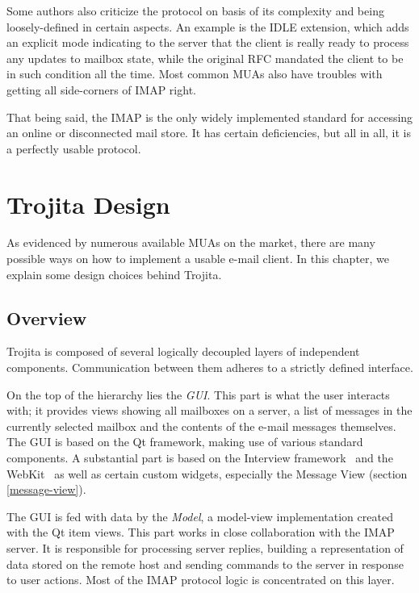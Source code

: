 \documentclass[12pt,notitlepage]{report}
\newcommand{\trojita}{Trojita\xspace}
\begin{document}
Some authors also criticize the protocol on basis of its complexity and being
loosely-defined in certain aspects.  An example is the IDLE \cite{rfc-idle}
extension, which adds an explicit mode indicating to the server that the client
is really ready to process any updates to mailbox state, while the original RFC
mandated the client to be in such condition all the time.  Most common MUAs also
have troubles with getting all side-corners of IMAP right.

That being said, the IMAP is the only widely implemented standard for accessing
an online or disconnected mail store.  It has certain deficiencies, but all in
all, it is a perfectly usable protocol.

\chapter{\trojita Design}
\label{trojita-design}

As evidenced by numerous available MUAs on the market, there are many possible
ways on how to implement a usable e-mail client.  In this chapter, we explain
some design choices behind \trojita.

\section{Overview}

\trojita is composed of several logically decoupled layers of independent
components.  Communication between them adheres to a strictly defined interface.

On the top of the hierarchy lies the {\em GUI}.  This part is what the user
interacts with; it provides views showing all mailboxes on a server, a list of
messages in the currently selected mailbox and the contents of the e-mail
messages themselves.  The GUI is based on the Qt framework, making use of
various standard components.  A substantial part is based on the Interview
framework~\cite{qt-interview} and the WebKit~\cite{qt-webkit} as well as certain
custom widgets, especially the Message View (section \ref{message-view}).

The GUI is fed with data by the {\em Model}, a model-view implementation created
with the Qt item views.  This part works in close collaboration with the IMAP
server. It is responsible for processing server replies, building a
representation of data stored on the remote host and sending commands to the
server in response to user actions.  Most of the IMAP protocol logic is
concentrated on this layer.
\end{document}
